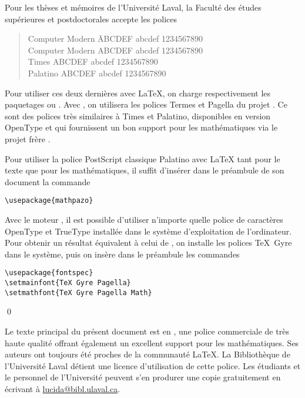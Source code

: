 Pour les thèses et mémoires de l'Université Laval, la Faculté des
études supérieures et postdoctorales accepte les polices %
\begin{quote}
  \begin{tabbing}
    Computer Modern \qquad \=  ABCDEF abcdef 1234567890 \kill \\
    {\CM Computer Modern} \> {\CM ABCDEF abcdef 1234567890} \\
    {\Times Times} \> {\Times ABCDEF abcdef 1234567890} \\
    {\Palatino Palatino} \> {\Palatino ABCDEF abcdef 1234567890}
  \end{tabbing}
\end{quote}
Pour utiliser ces deux dernières avec {\LaTeX}, on charge
respectivement les paquetages  ou . Avec
{\XeLaTeX}, on utilisera les polices Termes et Pagella du projet %
.
Ce sont des polices très similaires à Times et Palatino, disponibles
en version OpenType et qui fournissent un bon support pour les
mathématiques via le projet frère %
.

\begin{exemple}
  \label{ex:trucs:palatino}
  Pour utiliser la police PostScript classique Palatino avec {\LaTeX}
  tant pour le texte que pour les mathématiques, il suffit d'insérer
  dans le préambule de son document la commande
\begin{lstlisting}
\usepackage{mathpazo}
\end{lstlisting}

  Avec le moteur {\XeLaTeX}, il est possible d'utiliser n'importe
  quelle police de caractères OpenType et TrueType installée dans le
  système d'exploitation de l'ordinateur. Pour obtenir un résultat
  équivalent à celui de , on installe les polices
  TeX~Gyre dans le système, puis on insère dans le préambule les
  commandes
\begin{lstlisting}
\usepackage{fontspec}
\setmainfont{TeX Gyre Pagella}
\setmathfont{TeX Gyre Pagella Math}
\end{lstlisting}
  \qed
\end{exemple}

Le texte principal du présent document est en %
, %
une police commerciale de très haute qualité offrant également un
excellent support pour les mathématiques. Ses auteurs ont toujours été
proches de la communauté {\LaTeX}. La Bibliothèque de l'Université
Laval détient une licence d'utilisation de cette police. Les étudiants
et le personnel de l'Université peuvent s'en produrer une copie
gratuitement en écrivant à
\href{mailto:lucida@bibl.ulaval.ca}{lucida@bibl.ulaval.ca}.



